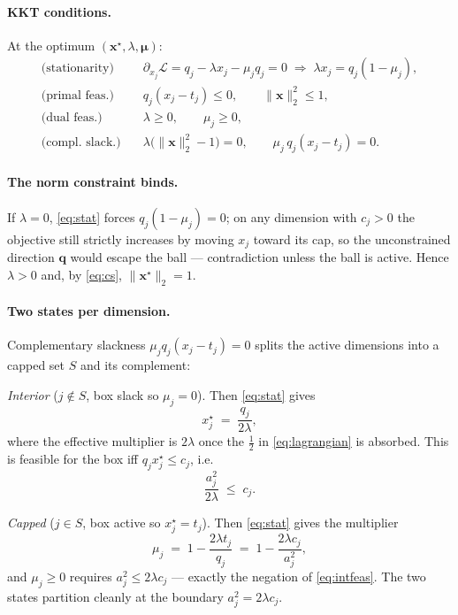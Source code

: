 \documentclass[11pt,a4paper]{article}
\newcommand{\qv}{\mathbf{q}}
\newcommand{\xv}{\mathbf{x}}
\newcommand{\norm}[1]{\lVert #1 \rVert}
\begin{document}
\paragraph{KKT conditions.} At the optimum $(\xv^\star,\lambda,\bm\mu)$:
\begin{align}
  \text{(stationarity)}\quad
    & \partial_{x_j}\mathcal{L}
      = q_j - \lambda x_j - \mu_j q_j = 0
      \;\Longrightarrow\; \lambda x_j = q_j(1-\mu_j),
      \label{eq:stat}\\[2pt]
  \text{(primal feas.)}\quad
    & q_j(x_j-t_j)\le0,\qquad \norm{\xv}_2^2\le1,\\[2pt]
  \text{(dual feas.)}\quad
    & \lambda\ge0,\qquad \mu_j\ge0,\\[2pt]
  \text{(compl.\ slack.)}\quad
    & \lambda\big(\norm{\xv}_2^2-1\big)=0,\qquad \mu_j\,q_j(x_j-t_j)=0.
      \label{eq:cs}
\end{align}

\paragraph{The norm constraint binds.} If $\lambda=0$, \eqref{eq:stat} forces
$q_j(1-\mu_j)=0$; on any dimension with $c_j>0$ the objective still strictly
increases by moving $x_j$ toward its cap, so the unconstrained direction $\qv$
would escape the ball --- contradiction unless the ball is active. Hence
$\lambda>0$ and, by \eqref{eq:cs}, $\norm{\xv^\star}_2=1$.

\paragraph{Two states per dimension.} Complementary slackness $\mu_j q_j(x_j-t_j)
=0$ splits the active dimensions into a capped set $S$ and its complement:

\emph{Interior} ($j\notin S$, box slack so $\mu_j=0$). Then \eqref{eq:stat}
gives
\begin{equation}
  x_j^\star \;=\; \frac{q_j}{2\lambda},
  \label{eq:interior}
\end{equation}
where the effective multiplier is $2\lambda$ once the $\tfrac12$ in
\eqref{eq:lagrangian} is absorbed. This is feasible for the box iff
$q_j x_j^\star \le c_j$, i.e.
\begin{equation}
  \frac{a_j^2}{2\lambda}\;\le\; c_j .
  \label{eq:intfeas}
\end{equation}

\emph{Capped} ($j\in S$, box active so $x_j^\star=t_j$). Then \eqref{eq:stat}
gives the multiplier
\begin{equation}
  \mu_j \;=\; 1 - \frac{2\lambda t_j}{q_j}
        \;=\; 1 - \frac{2\lambda c_j}{a_j^2},
  \label{eq:mu}
\end{equation}
and $\mu_j\ge0$ requires $a_j^2 \le 2\lambda c_j$ --- exactly the negation of
\eqref{eq:intfeas}. The two states partition cleanly at the boundary
$a_j^2 = 2\lambda c_j$.
\end{document}
